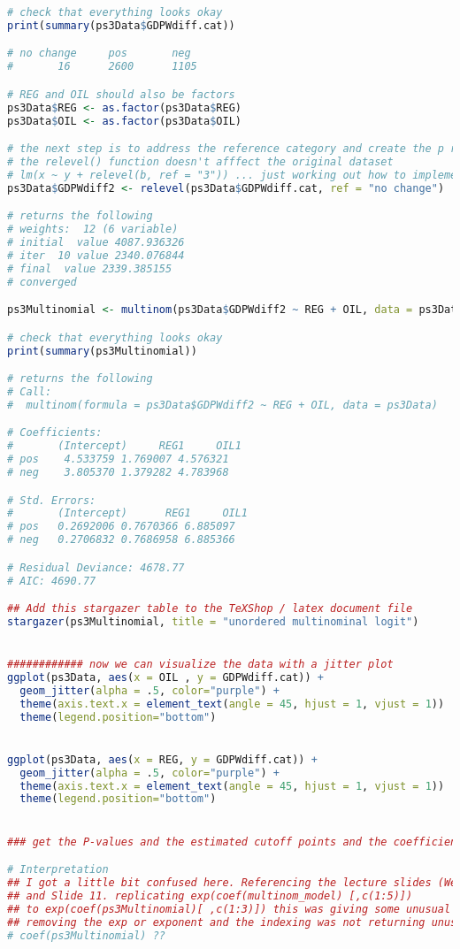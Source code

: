 \documentclass[12pt,letterpaper]{article}
\begin{document}
\begin{enumerate}
\begin{lstlisting}[language=R]
# check that everything looks okay 
print(summary(ps3Data$GDPWdiff.cat))

# no change     pos       neg 
#       16      2600      1105 

# REG and OIL should also be factors
ps3Data$REG <- as.factor(ps3Data$REG)
ps3Data$OIL <- as.factor(ps3Data$OIL)

# the next step is to address the reference category and create the p regression model 
# the relevel() function doesn't afffect the original dataset
# lm(x ~ y + relevel(b, ref = "3")) ... just working out how to implement it
ps3Data$GDPWdiff2 <- relevel(ps3Data$GDPWdiff.cat, ref = "no change")

# returns the following
# weights:  12 (6 variable)
# initial  value 4087.936326 
# iter  10 value 2340.076844
# final  value 2339.385155 
# converged

ps3Multinomial <- multinom(ps3Data$GDPWdiff2 ~ REG + OIL, data = ps3Data)

# check that everything looks okay 
print(summary(ps3Multinomial))

# returns the following 
# Call:
#  multinom(formula = ps3Data$GDPWdiff2 ~ REG + OIL, data = ps3Data)

# Coefficients:
#       (Intercept)     REG1     OIL1
# pos    4.533759 1.769007 4.576321
# neg    3.805370 1.379282 4.783968

# Std. Errors:
#       (Intercept)      REG1     OIL1
# pos   0.2692006 0.7670366 6.885097
# neg   0.2706832 0.7686958 6.885366

# Residual Deviance: 4678.77 
# AIC: 4690.77 

## Add this stargazer table to the TeXShop / latex document file 
stargazer(ps3Multinomial, title = "unordered multinominal logit")


############ now we can visualize the data with a jitter plot
ggplot(ps3Data, aes(x = OIL , y = GDPWdiff.cat)) +
  geom_jitter(alpha = .5, color="purple") +
  theme(axis.text.x = element_text(angle = 45, hjust = 1, vjust = 1))  +
  theme(legend.position="bottom")


ggplot(ps3Data, aes(x = REG, y = GDPWdiff.cat)) +
  geom_jitter(alpha = .5, color="purple") +
  theme(axis.text.x = element_text(angle = 45, hjust = 1, vjust = 1))  +
  theme(legend.position="bottom")


### get the P-values and the estimated cutoff points and the coefficients 

# Interpretation 
## I got a little bit confused here. Referencing the lecture slides (Week 8: Multinomial Logit Regression) 
## and Slide 11. replicating exp(coef(multinom_model) [,c(1:5)]) 
## to exp(coef(ps3Multinomial)[ ,c(1:3)]) this was giving some unusual values 
## removing the exp or exponent and the indexing was not returning unusal values 
# coef(ps3Multinomial) ??


\end{lstlisting}
\end{enumerate}
\end{document}

